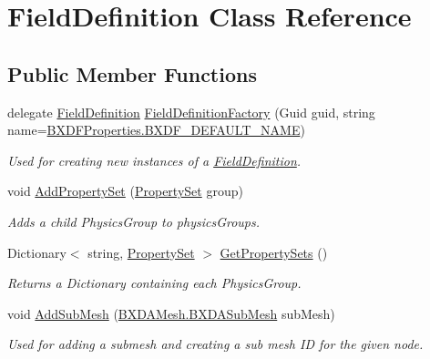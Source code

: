 \hypertarget{class_field_definition}{}\section{Field\+Definition Class Reference}
\label{class_field_definition}
\subsection*{Public Member Functions}
\begin{DoxyCompactItemize}
\item 
delegate \hyperlink{class_field_definition}{Field\+Definition} \hyperlink{class_field_definition_af50dfa2594c8b9ac6fcc592356c0117a}{Field\+Definition\+Factory} (Guid guid, string name=\hyperlink{class_b_x_d_f_properties_a528bb431080585f72f9f74bd44a23932}{B\+X\+D\+F\+Properties.\+B\+X\+D\+F\+\_\+\+D\+E\+F\+A\+U\+L\+T\+\_\+\+N\+A\+ME})
\begin{DoxyCompactList}\small\item\em Used for creating new instances of a \hyperlink{class_field_definition}{Field\+Definition}. \end{DoxyCompactList}\item 
void \hyperlink{class_field_definition_a60993e440fc55566badba6799f94310a}{Add\+Property\+Set} (\hyperlink{struct_property_set}{Property\+Set} group)
\begin{DoxyCompactList}\small\item\em Adds a child Physics\+Group to physics\+Groups. \end{DoxyCompactList}\item 
Dictionary$<$ string, \hyperlink{struct_property_set}{Property\+Set} $>$ \hyperlink{class_field_definition_a46ad3d304c6caad10fa8cef5ddf0fe1f}{Get\+Property\+Sets} ()
\begin{DoxyCompactList}\small\item\em Returns a Dictionary containing each Physics\+Group. \end{DoxyCompactList}\item 
void \hyperlink{class_field_definition_ad2d85f2d301af51825dd119f15936357}{Add\+Sub\+Mesh} (\hyperlink{class_b_x_d_a_mesh_1_1_b_x_d_a_sub_mesh}{B\+X\+D\+A\+Mesh.\+B\+X\+D\+A\+Sub\+Mesh} sub\+Mesh)
\begin{DoxyCompactList}\small\item\em Used for adding a submesh and creating a sub mesh ID for the given node. \end{DoxyCompactList}\item 

\end{DoxyCompactItemize}
